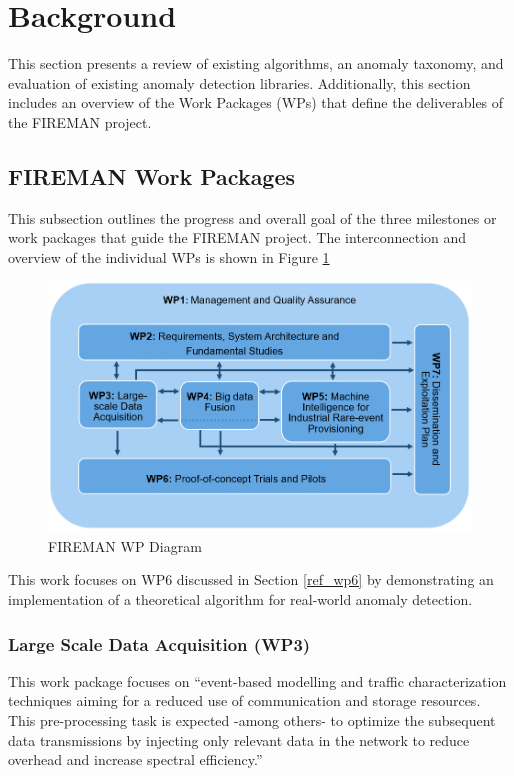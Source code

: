 \section{Background}
This section presents a review of existing algorithms, an anomaly taxonomy, and evaluation of existing anomaly detection libraries. Additionally, this section includes an overview of the Work Packages (WPs) that define the deliverables of the FIREMAN project.

\subsection{FIREMAN Work Packages}
\label{ref_FIREMAN_WP}

This subsection outlines the progress and overall goal of the three milestones or work packages that guide the FIREMAN project. The interconnection and overview of the individual WPs is shown in Figure \ref{fig:wp-diagram}

\begin{figure}[H]
    \includegraphics[width=\textwidth]{Images/FIREMAN_pert_diagram.png}
    \caption{FIREMAN WP Diagram \parencite{fireman-homepage}}
    \label{fig:wp-diagram}
\end{figure}

This work focuses on WP6 discussed in Section \ref{ref_wp6} by demonstrating an implementation of a theoretical algorithm for real-world anomaly detection.

\subsubsection{Large Scale Data Acquisition (WP3)}

This work package focuses on \enquote{event-based modelling and traffic characterization techniques aiming for a reduced use of communication and storage resources. This pre-processing task is expected -among others- to optimize the subsequent data transmissions by injecting only relevant data in the network to reduce overhead and increase spectral efficiency.} 

